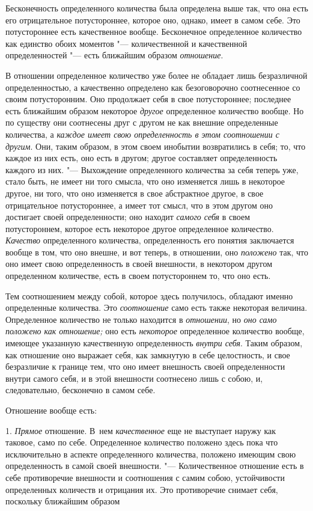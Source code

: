 Бесконечность определенного количества была определена выше так, что она
есть его отрицательное потустороннее, которое оно, однако, имеет в самом
себе. Это потустороннее есть качественное вообще. Бесконечное определенное
количество как единство обоих моментов "--- количественной и качественной
определенностей "--- есть ближайшим образом {\em отношение}.

В отношении определенное количество уже более не обладает лишь безразличной
определенностью, а качественно определено как безоговорочно соотнесенное со
своим потусторонним. Оно продолжает себя в свое потустороннее; последнее
есть ближайшим образом некоторое {\em другое}
определенное количество вообще. Но по существу они соотнесены друг с другом
не как внешние определенные количества, а {\em каждое
имеет свою определенность в этом соотношении с другим}. Они, таким образом,
в этом своем инобытии возвратились в себя; то, что каждое из них есть, оно
есть в другом; другое составляет определенность каждого из них. "---
Выхождение определенного количества за себя теперь уже, стало быть, не
имеет ни того смысла, что оно изменяется лишь в некоторое другое, ни того,
что оно изменяется в свое абстрактное другое, в свое отрицательное
потустороннее, а имеет тот смысл, что в этом другом оно достигает своей
определенности; оно находит {\em самого себя} в своем
потустороннем, которое есть некоторое другое определенное количество.
{\em Качество} определенного количества, определенность
его понятия заключается вообще в том, что оно внешне, и вот теперь, в
отношении, оно {\em положено} так, что оно имеет свою
определенность в своей внешности, в некотором другом определенном
количестве, есть в своем потустороннем то, что оно есть.

Тем соотношением между собой, которое здесь получилось, обладают именно
определенные количества. Это {\em соотношение} само
есть также некоторая величина. Определенное количество не только находится
в {\em отношении}, но {\em оно само положено как отношение;} оно есть
{\em некоторое} определенное количество вообще, имеющее указанную
качественную определенность {\em внутри себя}. Таким образом, как
отношение оно выражает себя, как замкнутую в себе целостность, и свое
безразличие к границе тем, что оно имеет внешность своей определенности
внутри самого себя, и в этой внешности соотнесено лишь с собою, и,
следовательно, бесконечно в самом себе.

Отношение вообще есть:

1. {\em Прямое} отношение. В~нем
{\em качественное} еще не выступает наружу как таковое,
само по себе. Определенное количество положено здесь пока что исключительно
в аспекте определенного количества, положено имеющим свою определенность в
самой своей внешности. "--- Количественное отношение есть в себе противоречие
внешности и соотношения с самим собою, устойчивости определенных количеств
и отрицания их. Это противоречие снимает себя, поскольку ближайшим образом

